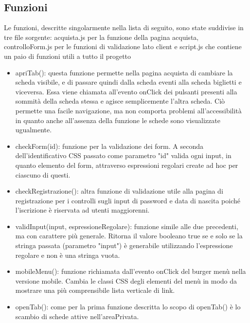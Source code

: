     \subsection{Funzioni}
        Le funzioni, descritte singolarmente nella lista di seguito, sono state suddivise in tre file sorgente: acquista.js per la funzione della pagina acquista, controlloForm.js per le funzioni di validazione lato client e script.js che contiene un paio di funzioni utili a tutto il progetto
        \begin{itemize}
            \item apriTab(): questa funzione permette nella pagina acquista di cambiare la scheda visibile, e di passare quindi dalla scheda eventi alla scheda biglietti e viceversa. Essa viene chiamata all'evento onClick dei pulsanti presenti alla sommità della scheda stessa e agisce semplicemente l'altra scheda. Ciò permette una facile navigazione, ma non comporta problemi all'accessibilità in quanto anche all'assenza della funzione le schede sono visualizzate ugualmente.
            \item checkForm(id): funzione per la validazione dei form. A seconda dell'identificativo CSS passato come parametro "id" valida ogni input, in quanto elemento del form, attraverso espressioni regolari create ad hoc per ciascuno di questi.
            \item checkRegistrazione(): altra funzione di validazione utile alla pagina di registrazione per i controlli sugli input di password e data di nascita poiché l'iscrizione è riservata ad utenti maggiorenni.
            \item validInput(input, espressioneRegolare): funzione simile alle due precedenti, ma con carattere più generale. Ritorna il valore booleano true se e solo se la stringa passata (parametro "input") è generabile utilizzando l'espressione regolare e non è una stringa vuota.
            \item mobileMenu(): funzione richiamata dall'evento onClick del burger menù nella versione mobile. Cambia le classi CSS degli elementi del menù in modo da mostrare una più comprensibile lista verticale di link.
            \item openTab(): come per la prima funzione descritta lo scopo di openTab() è lo scambio di schede attive nell'areaPrivata.
        \end{itemize}
